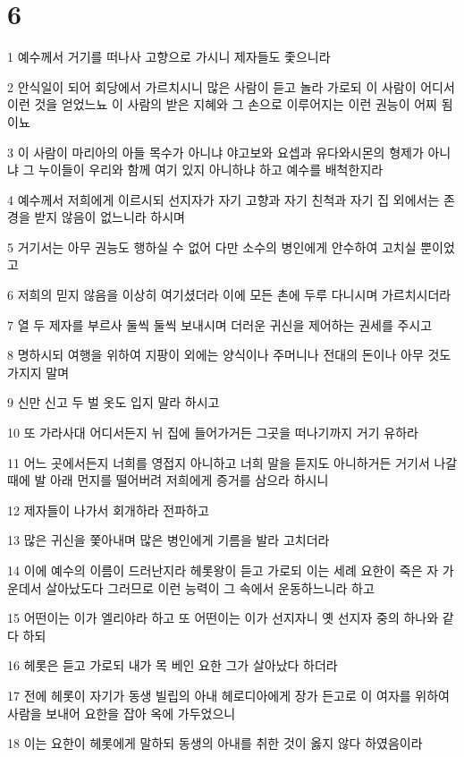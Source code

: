 \chapter{6}

\par 1 예수께서 거기를 떠나사 고향으로 가시니 제자들도 좇으니라
\par 2 안식일이 되어 회당에서 가르치시니 많은 사람이 듣고 놀라 가로되 이 사람이 어디서 이런 것을 얻었느뇨 이 사람의 받은 지혜와 그 손으로 이루어지는 이런 권능이 어찌 됨이뇨
\par 3 이 사람이 마리아의 아들 목수가 아니냐 야고보와 요셉과 유다와시몬의 형제가 아니냐 그 누이들이 우리와 함께 여기 있지 아니하냐 하고 예수를 배척한지라
\par 4 예수께서 저희에게 이르시되 선지자가 자기 고향과 자기 친척과 자기 집 외에서는 존경을 받지 않음이 없느니라 하시며
\par 5 거기서는 아무 권능도 행하실 수 없어 다만 소수의 병인에게 안수하여 고치실 뿐이었고
\par 6 저희의 믿지 않음을 이상히 여기셨더라 이에 모든 촌에 두루 다니시며 가르치시더라
\par 7 열 두 제자를 부르사 둘씩 둘씩 보내시며 더러운 귀신을 제어하는 권세를 주시고
\par 8 명하시되 여행을 위하여 지팡이 외에는 양식이나 주머니나 전대의 돈이나 아무 것도 가지지 말며
\par 9 신만 신고 두 벌 옷도 입지 말라 하시고
\par 10 또 가라사대 어디서든지 뉘 집에 들어가거든 그곳을 떠나기까지 거기 유하라
\par 11 어느 곳에서든지 너희를 영접지 아니하고 너희 말을 듣지도 아니하거든 거기서 나갈 때에 발 아래 먼지를 떨어버려 저희에게 증거를 삼으라 하시니
\par 12 제자들이 나가서 회개하라 전파하고
\par 13 많은 귀신을 쫓아내며 많은 병인에게 기름을 발라 고치더라
\par 14 이에 예수의 이름이 드러난지라 헤롯왕이 듣고 가로되 이는 세례 요한이 죽은 자 가운데서 살아났도다 그러므로 이런 능력이 그 속에서 운동하느니라 하고
\par 15 어떤이는 이가 엘리야라 하고 또 어떤이는 이가 선지자니 옛 선지자 중의 하나와 같다 하되
\par 16 헤롯은 듣고 가로되 내가 목 베인 요한 그가 살아났다 하더라
\par 17 전에 헤롯이 자기가 동생 빌립의 아내 헤로디아에게 장가 든고로 이 여자를 위하여 사람을 보내어 요한을 잡아 옥에 가두었으니
\par 18 이는 요한이 헤롯에게 말하되 동생의 아내를 취한 것이 옳지 않다 하였음이라
